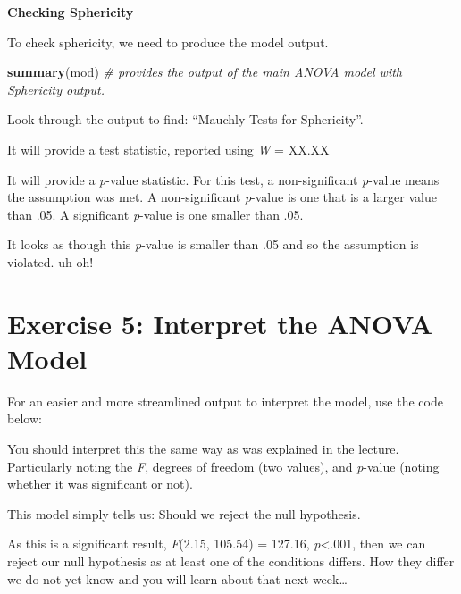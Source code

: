 \documentclass[
]{book}
\newenvironment{Shaded}{\begin{snugshade}}{\end{snugshade}}
\newcommand{\CommentTok}[1]{\textcolor[rgb]{0.56,0.35,0.01}{\textit{#1}}}
\newcommand{\FunctionTok}[1]{\textcolor[rgb]{0.13,0.29,0.53}{\textbf{#1}}}
\newcommand{\NormalTok}[1]{#1}
\newcommand{\SpecialCharTok}[1]{\textcolor[rgb]{0.81,0.36,0.00}{\textbf{#1}}}
\let\oldsection\section
\renewcommand{\section}{\needspace{5\baselineskip}\oldsection}
\begin{document}
\textbf{Checking Sphericity}

To check sphericity, we need to produce the model output.

\begin{Shaded}
\begin{Highlighting}[]
\FunctionTok{summary}\NormalTok{(mod) }\CommentTok{\# provides the output of the main ANOVA model with Sphericity output.}
\end{Highlighting}
\end{Shaded}

Look through the output to find: ``Mauchly Tests for Sphericity''.

It will provide a test statistic, reported using \emph{W} = XX.XX

It will provide a \emph{p}-value statistic. For this test, a non-significant \emph{p}-value means the assumption was met. A non-significant \emph{p}-value is one that is a larger value than .05. A significant \emph{p}-value is one smaller than .05.

It looks as though this \emph{p}-value is smaller than .05 and so the assumption is violated. uh-oh!

\section{Exercise 5: Interpret the ANOVA Model}\label{exercise-5-interpret-the-anova-model}

For an easier and more streamlined output to interpret the model, use the code below:

\begin{Shaded}
\end{Shaded}

You should interpret this the same way as was explained in the lecture. Particularly noting the \emph{F}, degrees of freedom (two values), and \emph{p}-value (noting whether it was significant or not).

This model simply tells us: Should we reject the null hypothesis.

As this is a significant result, \emph{F}(2.15, 105.54) = 127.16, \emph{p}\textless.001, then we can reject our null hypothesis as at least one of the conditions differs. How they differ we do not yet know and you will learn about that next week\ldots{}
\end{document}
